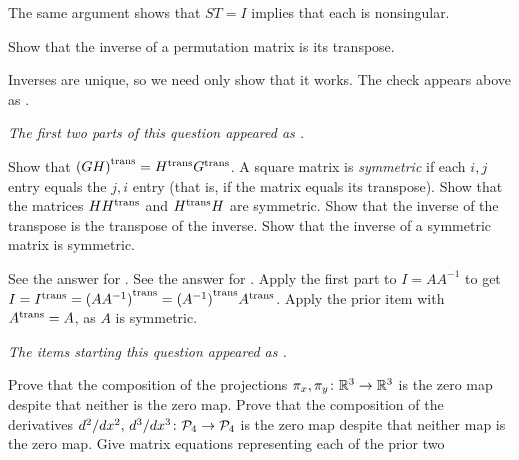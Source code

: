 \begin{exercises}
\begin{answer}
\begin{exparts}
          The same argument shows that \( ST=I \) implies that 
          each is nonsingular.
      \end{exparts}  
    \end{answer}
  \item 
    Show that the inverse of a permutation matrix is its transpose.
    \begin{answer}
      Inverses are unique, so we need only show that it works.
      The check appears above as
      .  
    \end{answer}
  \item 
    \textit{The first two parts of this question appeared as
    .}
    \begin{exparts}
      \partsitem Show that \( {{(GH)}^{\rm trans}}={{H}^{\rm trans}}{{G}^{\rm trans}} \).
      \partsitem A square matrix is {\em symmetric\/} if each 
        \( i,j \) entry equals the
        \( j,i \) entry (that is, if the matrix equals its transpose).
        Show that 
        the matrices \( H{{H}^{\rm trans}} \) and \( {{H}^{\rm trans}}H \) are symmetric.
      \partsitem Show that the inverse of the transpose is the transpose 
        of the inverse.
      \partsitem Show that the inverse of a symmetric matrix is symmetric.
    \end{exparts}
    \begin{answer}
      \begin{exparts}
        \partsitem See the answer for .
        \partsitem See the answer for .
        \partsitem Apply the first part to  
          \( I=AA^{-1} \) to get
          $I={{I}^{\rm trans}}={{(AA^{-1})}^{\rm trans}}={{(A^{-1})}^{\rm trans}}{{A}^{\rm trans}}$.
        \partsitem Apply the prior item with \( {{A}^{\rm trans}}=A \),
          as \( A \) is symmetric.
      \end{exparts}  
    \end{answer}
  \recommended \item
    \textit{The items starting this question appeared as
    .}
    \begin{exparts}
      \partsitem Prove that the composition of the projections
        \( \mbox{$\pi_x,\pi_y\colon \mathbb{R}^3\to \mathbb{R}^3$} \) is the zero map despite that
        neither is the zero map.
      \partsitem Prove that the composition of the derivatives
        \( \mbox{$d^2/dx^2,\,d^3/dx^3\colon \mathcal{P}_4\to \mathcal{P}_4$} \)
        is the zero map despite that neither map is the zero map.
      \partsitem Give matrix equations representing each of the prior two

\end{exparts}
\end{exercises}

